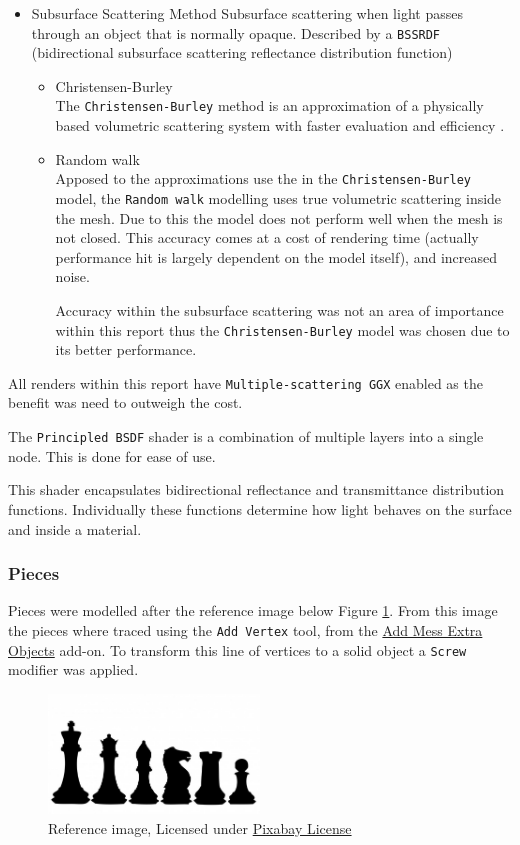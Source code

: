\documentclass[11pt]{article}
\begin{document}
\begin{itemize}
\item Subsurface Scattering Method
Subsurface scattering when light passes through an object that is normally
opaque. Described by a \texttt{BSSRDF} (bidirectional subsurface scattering
reflectance distribution function)
\begin{itemize}
\item Christensen-Burley \\
The \texttt{Christensen-Burley} method is an approximation of a physically based
volumetric scattering system with faster evaluation and efficiency \cite{Christensen-Burley}.
\item Random walk \\
Apposed to the approximations use the in the \texttt{Christensen-Burley} model,
the \texttt{Random walk} modelling uses true volumetric scattering inside the mesh.
Due to this the model does not perform well when the mesh is not closed.
This accuracy comes at a cost of rendering time (actually performance hit is largely
dependent on the model itself), and increased noise.

Accuracy within the subsurface scattering was not an area of importance
within this report thus the \texttt{Christensen-Burley} model was chosen due to
its better performance.
\end{itemize}
\end{itemize}

All renders within this report have \texttt{Multiple-scattering GGX} enabled as the
benefit was need to outweigh the cost.

The \texttt{Principled BSDF} shader is a combination of multiple layers into a single
node. This is done for ease of use.

This shader encapsulates bidirectional reflectance and transmittance
distribution functions. Individually these functions determine how light behaves
on the surface and inside a material.


\subsubsection{Pieces}
\label{sec:orgfaed952}
Pieces were modelled after the reference image below Figure \ref{piece-reference}.
From this image the pieces where traced using the \texttt{Add Vertex} tool, from the
\href{https://docs.blender.org/manual/en/2.92/addons/add\_mesh/mesh\_extra\_objects.html}{Add Mess Extra Objects} add-on. To transform this line of vertices to a solid
object  a \texttt{Screw} modifier was applied.
\begin{figure}[htbp]
\centering
\includegraphics[width=0.5\textwidth]{ref/bee5aa3d08a30da4ca1005cbd0fe10b54a03bb49.jpg}
\caption{\label{piece-reference}Reference image, Licensed under \href{https://pixabay.com/service/license/}{Pixabay License}}
\end{figure}
\end{document}
